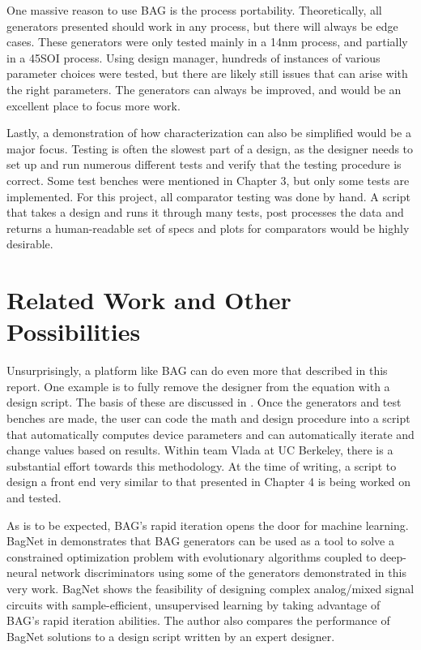 One massive reason to use BAG is the process portability. Theoretically, all generators presented should work in any process, but there will always be edge cases. These generators were only tested mainly in a 14nm process, and partially in a 45SOI process. Using design manager, hundreds of instances of various parameter choices were tested, but there are likely still issues that can arise with the right parameters. The generators can always be improved, and would be an excellent place to focus more work.

Lastly, a demonstration of how characterization can also be simplified would be a major focus. Testing is often the slowest part of a design, as the designer needs to set up and run numerous different tests and verify that the testing procedure is correct. Some test benches were mentioned in Chapter 3, but only some tests are implemented. For this project, all comparator testing was done by hand. A script that takes a design and runs it through many tests, post processes the data and returns a human-readable set of specs and plots for comparators would be highly desirable. 
\section{Related Work and Other Possibilities}
Unsurprisingly, a platform like BAG can do even more that described in this report. One example is to fully remove the designer from the equation with a design script. The basis of these are discussed in \cite{chang_bag2:_2018}. Once the generators and test benches are made, the user can code the math and design procedure into a script that automatically computes device parameters and can automatically iterate and change values based on results. Within team Vlada at UC Berkeley, there is a substantial effort towards this methodology. At the time of writing, a script to design a front end very similar to that presented in Chapter 4 is being worked on and tested.

As is to be expected, BAG's rapid iteration opens the door for machine learning. BagNet in \cite{hakhamaneshi_late_nodate} demonstrates that BAG generators can be used as a tool to solve a constrained optimization problem with evolutionary algorithms coupled to deep-neural network discriminators using some of the generators demonstrated in this very work. BagNet shows the feasibility of designing complex analog/mixed signal circuits with sample-efficient, unsupervised learning by taking advantage of BAG's rapid iteration abilities. The author also compares the performance of BagNet solutions to a design script written by an expert designer.